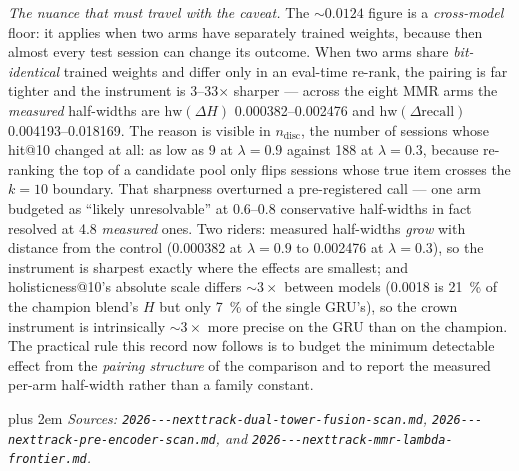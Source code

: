 \documentclass[11pt]{article}
\begin{document}
\emph{The nuance that must travel with the caveat.} The
${\sim}\num{0.0124}$ figure is a \emph{cross-model} floor: it applies when two
arms have separately trained weights, because then almost every test session can
change its outcome. When two arms share \emph{bit-identical} trained weights and
differ only in an eval-time re-rank, the pairing is far tighter and the
instrument is \numrange{3}{33}$\times$ sharper --- across the eight MMR arms the
\emph{measured} half-widths are $\mathrm{hw}(\Delta H)$
\numrange{0.000382}{0.002476} and $\mathrm{hw}(\Delta\text{recall})$
\numrange{0.004193}{0.018169}. The reason is visible in $n_{\text{disc}}$, the
number of sessions whose hit@10 changed at all: as low as \num{9} at
$\lambda=\num{0.9}$ against \num{188} at $\lambda=\num{0.3}$, because
re-ranking the top of a candidate pool only flips sessions whose true item
crosses the $k=10$ boundary. That sharpness overturned a pre-registered call ---
one arm budgeted as ``likely unresolvable'' at \numrange{0.6}{0.8} conservative
half-widths in fact resolved at \num{4.8} \emph{measured} ones. Two riders:
measured half-widths \emph{grow} with distance from the control
(\num{0.000382} at $\lambda=\num{0.9}$ to \num{0.002476} at
$\lambda=\num{0.3}$), so the instrument is sharpest exactly where the effects
are smallest; and holisticness@10's absolute scale differs ${\sim}3\times$
between models (\num{0.0018} is \SI{21}{\percent} of the champion blend's $H$ but
only \SI{7}{\percent} of the single GRU's), so the crown instrument is
intrinsically ${\sim}3\times$ more precise on the GRU than on the champion. The
practical rule this record now follows is to budget the minimum detectable
effect from the \emph{pairing structure} of the comparison and to report the
measured per-arm half-width rather than a family constant.

{\rightskip=0pt plus 2em \emph{Sources: \texttt{2026---\allowbreak nexttrack-\allowbreak dual-\allowbreak tower-\allowbreak fusion-\allowbreak scan.md},
\texttt{2026---\allowbreak nexttrack-\allowbreak pre-\allowbreak encoder-\allowbreak scan.md},
and \texttt{2026---\allowbreak nexttrack-\allowbreak mmr-\allowbreak lambda-\allowbreak frontier.md}.}\par}
\end{document}
